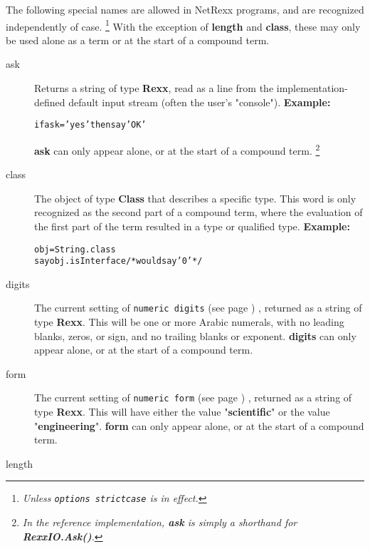 The following special names are allowed in NetRexx programs, and are
recognized independently of case.
\footnote{
\emph{Unless \texttt{options strictcase} is in effect.
}
}
With the exception of \textbf{length} and \textbf{class}, these
may only be used alone as a term or at the start of a compound term.
\begin{description}
\item[ask]\label{refswask}
 
Returns a string of type \textbf{Rexx}, read as a line from the
implementation-defined default input stream (often the user's
"console").
 \textbf{Example:}
\begin{alltt}
if ask='yes' then say 'OK'
\end{alltt}
 \textbf{ask} can only appear alone, or at the start of a
compound term.
\footnote{
\emph{In the reference implementation, \textbf{ask} is simply a shorthand
for \textbf{RexxIO.Ask()}.}
}
\item[class]\label{refswclass}
 
The object of type \textbf{Class} that describes a specific type.
This word is only recognized as the second part of a compound term,
where the evaluation of the first part of the term resulted in a
type or qualified type.
 \textbf{Example:}
\begin{alltt}
obj=String.class
say obj.isInterface /* would say '0' */
\end{alltt}
\item[digits]\label{refswdigit}
 
The current setting of  \texttt{numeric digits} (see page \pageref{refndigits}) ,
returned as a string of type \textbf{Rexx}.
This will be one or more Arabic numerals, with no leading blanks, zeros,
or sign, and no trailing blanks or exponent.
 \textbf{digits} can only appear alone, or at the start of a
compound term.
\item[form]\label{refswform}
 
The current setting of  \texttt{numeric form} (see page \pageref{refnform}) ,
returned as a string of type \textbf{Rexx}.
This will have either the value "\textbf{scientific}" or the
value "\textbf{engineering}".
 \textbf{form} can only appear alone, or at the start of a
compound term.
\item[length]\label{refswleng}
 

\end{description}
